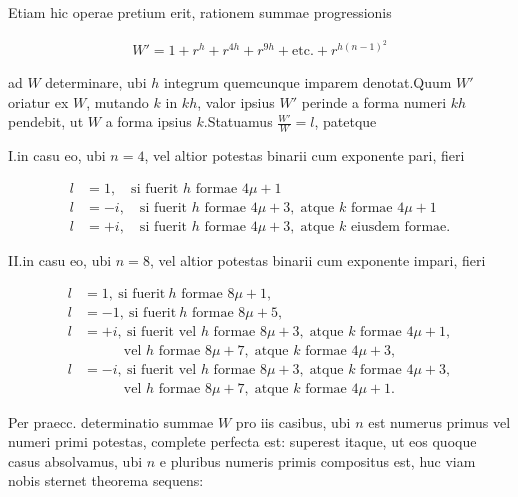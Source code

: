 
Etiam hic operae pretium erit, rationem summae progressionis

\[
\begin{aligned}
W'=1+r^h+r^{4h}+r^{9h}+\text{etc.}+r^{h(n-1)^2}
\end{aligned}
\]

ad $W$ determinare, ubi $h$ integrum quemcunque imparem denotat.\quad Quum $W'$ oriatur ex $W$, mutando $k$ in $kh$, valor ipsius $W'$ perinde a forma numeri $kh$ pendebit, ut $W$ a forma ipsius $k$.\quad Statuamus $\frac{W'}{W}=l$, patetque

I.\quad in casu eo, ubi $n=4$, vel altior potestas binarii cum exponente pari, fieri

\[
\begin{aligned}
l&=1,\quad\text{si fuerit }h\text{ formae }4\mu+1\\
l&=-i,\quad\text{si fuerit }h\text{ formae }4\mu+3,\;\text{atque }k\text{ formae }4\mu+1\\
l&=+i,\quad\text{si fuerit }h\text{ formae }4\mu+3,\;\text{atque }k\text{ eiusdem formae.}
\end{aligned}
\]

%
II.\quad in casu eo, ubi $n=8$, vel altior potestas binarii cum exponente impari, fieri

\[
\begin{aligned}
l&=1,\ \text{si fuerit}\  h\text{ formae }8\mu+1,\\
l&=-1,\ \text{si fuerit}\  h\text{ formae }8\mu+5,\\
l&=+i,\ \text{si fuerit vel }h\text{ formae }8\mu+3,\;\text{atque }k\text{ formae }4\mu+1,\\
&\phantom{=+i,}\text{vel }h\text{ formae }8\mu+7,\;\text{atque }k\text{ formae }4\mu+3,\\
l&=-i,\ \text{si fuerit vel }h\text{ formae }8\mu+3,\;\text{atque }k\text{ formae }4\mu+3,\\
&\phantom{=+i,}\text{vel }h\text{ formae }8\mu+7,\;\text{atque }k\text{ formae }4\mu+1.
\end{aligned}
\]

Per praecc. determinatio summae $W$ pro iis casibus, ubi $n$ est numerus primus vel numeri primi potestas, complete perfecta est: superest itaque, ut eos quoque casus absolvamus, ubi $n$ e pluribus numeris primis compositus est, huc viam nobis sternet theorema sequens:

